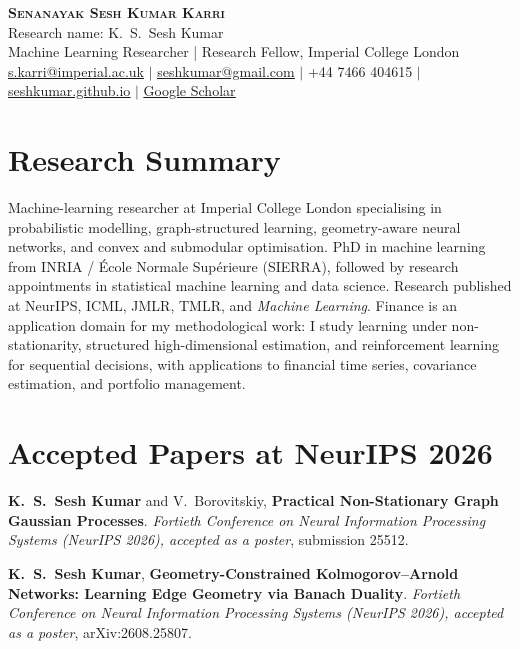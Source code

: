 \documentclass[a4paper,11pt]{article}
\newcommand{\me}{\textbf{K.~S.~Sesh Kumar}}
\newcommand{\pubListStart}{\begin{enumerate}[leftmargin=0.3in, topsep=2pt, itemsep=2pt, label={[\arabic*]}]}
\newcommand{\pubListEnd}{\end{enumerate}}
\newcommand{\pub}[4]{\item\small #1, \textbf{#2}. \textit{#3}, #4.}
\begin{document}
\begin{center}
    {\huge\scshape\bfseries\color{accent} Senanayak Sesh Kumar Karri}\\[2pt]
    {\small\color{subtle} Research name: K.~S.~Sesh Kumar}\\[2pt]
    {\small\color{subtle} Machine Learning Researcher | Research Fellow, Imperial College London}\\[3pt]
    \small \href{mailto:s.karri@imperial.ac.uk}{\underline{s.karri@imperial.ac.uk}} \;$|$\; \href{mailto:seshkumar@gmail.com}{\underline{seshkumar@gmail.com}} \;$|$\; +44 7466 404615 \;$|$\; \href{https://seshkumar.github.io}{\underline{seshkumar.github.io}} \;$|$\; \href{https://scholar.google.com/citations?user=FPVUA-YAAAAJ}{\underline{Google Scholar}}
\end{center}

\section{Research Summary}
\small
Machine-learning researcher at Imperial College London specialising in probabilistic modelling, graph-structured learning, geometry-aware neural networks, and convex and submodular optimisation. PhD in machine learning from INRIA / \'Ecole Normale Sup\'erieure (SIERRA), followed by research appointments in statistical machine learning and data science. Research published at NeurIPS, ICML, JMLR, TMLR, and \textit{Machine Learning}. Finance is an application domain for my methodological work: I study learning under non-stationarity, structured high-dimensional estimation, and reinforcement learning for sequential decisions, with applications to financial time series, covariance estimation, and portfolio management.
\normalsize

\section{Accepted Papers at NeurIPS 2026}
\pubListStart
  \pub{\me{} and V.~Borovitskiy}{Practical Non-Stationary Graph Gaussian Processes}{Fortieth Conference on Neural Information Processing Systems (NeurIPS 2026), accepted as a poster}{submission 25512}
  \pub{\me}{Geometry-Constrained Kolmogorov--Arnold Networks: Learning Edge Geometry via Banach Duality}{Fortieth Conference on Neural Information Processing Systems (NeurIPS 2026), accepted as a poster}{arXiv:2608.25807}
\pubListEnd
\end{document}
